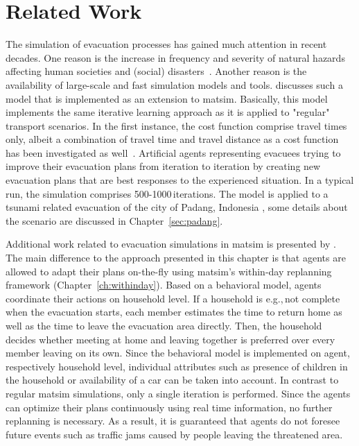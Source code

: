 \section{Related Work}
The simulation of evacuation processes has gained much attention in recent decades. One reason is the increase in frequency and severity of natural hazards affecting human societies and (social) disasters~\citep{Rodr2006HBoDisasterResearch}. Another reason is the availability of large-scale and fast simulation models and tools. \citet{Laemmel_PhDThesis_2011} discusses such a model that is implemented as an extension to \gls{matsim}. Basically, this model implements the same iterative learning approach as it is applied to "regular" transport scenarios. In the first instance, the cost function comprise travel times only, albeit a combination of travel time and travel distance as a cost function has been investigated as well~\citep{LaemmelKluepfelNagel2009EvacPadangAtBookTimmermanns}. 
Artificial agents representing evacuees trying to improve their evacuation plans from iteration to iteration by creating new evacuation plans that are best responses to the experienced situation. 
In a typical run, the simulation comprises 500-1000\,iterations. 
The model is applied to a tsunami related evacuation of the city of Padang, Indonesia \citep[e.g.,][]{TaubenboeckEtAl2012ConcludingLastMilePaperNatHazards,GosebergEtAl2012LastLastMile}, some details about the scenario are discussed in Chapter~\ref{sec:padang}. 

Additional work related to evacuation simulations in \gls{matsim} is presented by \citet{Dobler_PhDThesis_2013}. The main difference to the approach presented in this chapter is that agents are allowed to adapt their plans on-the-fly using \gls{matsim}'s within-day replanning framework \citep{DoblerEtAl_TRR_2012} (Chapter~\ref{ch:withinday}). 
Based on a behavioral model, agents coordinate their actions on household level. If a household is e.g.,\,not complete when the evacuation starts, each member estimates the time to return home as well as the time to leave the evacuation area directly. Then, the household decides whether meeting at home and leaving together is preferred over every member leaving on its own.
Since the behavioral model is implemented on agent, respectively household level, individual attributes such as presence of children in the household or availability of a car can be taken into account.
In contrast to regular \gls{matsim} simulations, only a single iteration is performed. Since the agents can optimize their plans continuously using real time information, no further replanning is necessary. As a result, it is guaranteed that agents do not foresee future events such as traffic jams caused by people leaving the threatened area.

